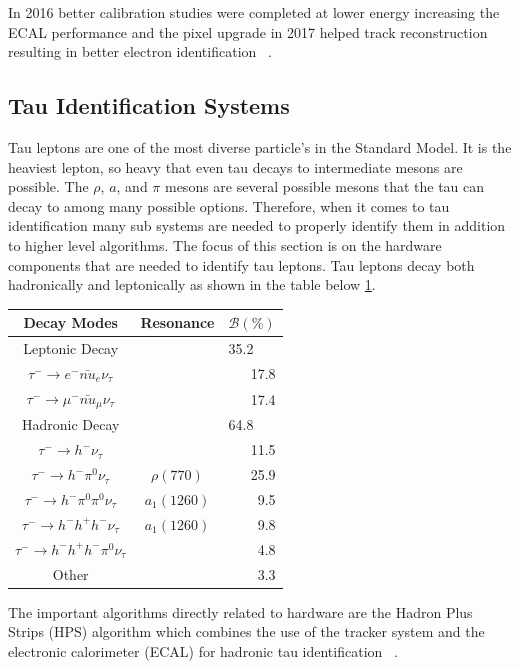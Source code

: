 In 2016 better calibration studies were completed at lower energy increasing the ECAL performance and the pixel upgrade in 2017 helped track reconstruction resulting in better electron identification ~\cite{Micheli:2727506}.


\subsection{Tau Identification Systems}
Tau leptons are one of the most diverse particle's in the Standard Model. It is the heaviest lepton, so heavy that even tau decays to intermediate mesons are possible. The $\rho$, $a$, and $\pi$ mesons are several possible mesons that the tau can decay to among many possible options. Therefore, when it comes to tau identification many sub systems are needed to properly identify them in addition to higher level algorithms. The focus of this section is on the hardware components that are needed to identify tau leptons. Tau leptons decay both hadronically and leptonically as shown in the table below \ref{tab:taudecay}. 



\begin{table}[h!tbp]
\centering
\label{tab:taudecay}
\begin{tabular}{c  c r}
Decay Modes & Resonance & \multicolumn{1}{c}{$\mathcal{B}(\%)$} \\\hline
Leptonic Decay && \multicolumn{1}{l}{35.2}\\
$\tau^- \rightarrow e^- \bar{nu}_e \nu_\tau $ & & 17.8 \\
$\tau^- \rightarrow \mu^- \bar{nu}_\mu \nu_\tau$ & & 17.4 \\\hline
Hadronic Decay && \multicolumn{1}{l}{64.8}\\
$\tau^- \rightarrow h^-\nu_\tau$ & & 11.5 \\
$\tau^- \rightarrow h^-\pi^0 \nu_\tau$ & $\rho(770)$ & 25.9 \\
$\tau^- \rightarrow h^-\pi^0 \pi^0 \nu_\tau$ & $a_1(1260)$ & 9.5 \\
$\tau^- \rightarrow h^- h^+ h^- \nu_\tau$ & $a_1(1260)$ & 9.8 \\
$\tau^- \rightarrow h^- h^+ h^- \pi^0 \nu_\tau$ & & 4.8 \\
Other & & 3.3 \\\hline
\end{tabular}
\end{table}

The important algorithms directly related to hardware are the Hadron Plus Strips (HPS) algorithm which combines the use of the tracker system and the electronic calorimeter (ECAL) for hadronic tau identification ~\cite{Sirunyan_2018}.  


 
